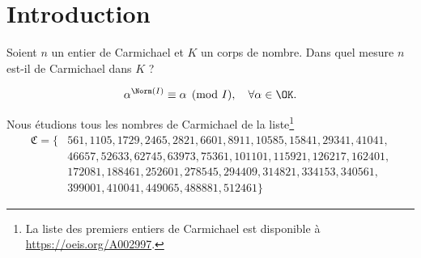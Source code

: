 \section*{Introduction}

\begin{question}\label{question-centrale}Soient $n$ un entier de Carmichael et $K$ un corps de nombre. Dans quel mesure $n$ est-il de Carmichael dans $K$ ?
\end{question}

\begin{equation}\label{eq-Carmichael}
\alpha^{\Norm(I)} \equiv \alpha \pmod{I}, \quad \forall \alpha \in \OK.
\end{equation}

Nous étudions tous les nombres de Carmichael de la liste\footnote{La liste des premiers entiers de Carmichael est disponible à \url{https://oeis.org/A002997}.} 
\begin{align*}
	\mathfrak{C} = \{& 561, 1105, 1729, 2465, 2821, 6601, 8911, 10585, 15841, 29341, 41041,\\ 
	& 46657, 52633, 62745, 63973, 75361, 101101, 115921, 126217, 162401, \\ 
	& 172081, 188461, 252601, 278545, 294409, 314821, 334153, 340561, \\
	& 399001, 410041, 449065, 488881, 512461\}
\end{align*}

